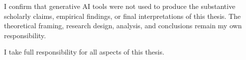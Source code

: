 

I confirm that generative AI tools were not used to produce the substantive scholarly claims, empirical findings, or final interpretations of this thesis. The theoretical framing, research design, analysis, and conclusions remain my own responsibility.

I take full responsibility for all aspects of this thesis.



